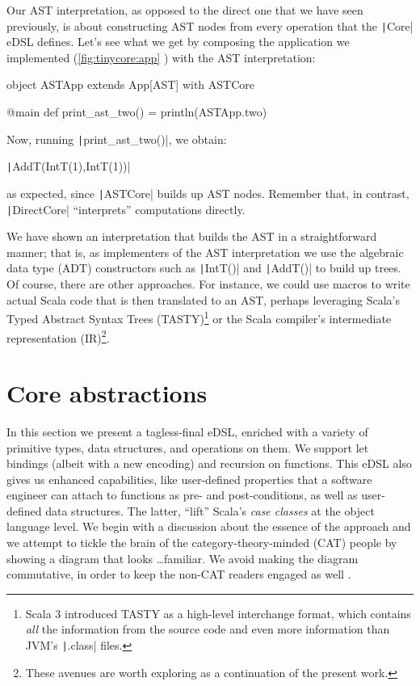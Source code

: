 \documentclass[11pt]{article}
\renewcommand{\vref}[1]{\autoref{#1} \vpageref{#1}}{}
\newcommand{\ScalaI}[1]{\texttt|#1|}
\newcommand{\TextI}[1]{\texttt|#1|}
\begin{document}
Our AST interpretation, as opposed to the direct one that we have seen previously, is about constructing AST nodes from every operation that the \ScalaI{Core} eDSL defines. Let's see what we get by composing the application we implemented (\vref{fig:tinycore:app}) with the AST interpretation:

\begin{ScalaBlockSimple}
object ASTApp extends App[AST] with ASTCore

@main def print_ast_two() = println(ASTApp.two)
\end{ScalaBlockSimple}

\noindent Now, running \ScalaI{print_ast_two()}, we obtain:

\par\ScalaI{AddT(IntT(1),IntT(1))}

\noindent as expected, since \ScalaI{ASTCore} builds up AST nodes. Remember that, in contrast, \ScalaI{DirectCore} ``interprets'' computations directly.

We have shown an interpretation that builds the AST in a straightforward manner; that is, as implementers of the AST interpretation we use the algebraic data type (ADT) constructors  such as \ScalaI{IntT()} and \ScalaI{AddT()} to build up trees. Of course, there are other approaches. For instance, we could use macros to write actual Scala code that is then translated to an AST, perhaps leveraging Scala's Typed Abstract Syntax Trees (TASTY)\footnote{Scala 3 introduced TASTY as a high-level interchange format, which contains \textit{all} the information from the source code and even more information than JVM's \TextI{.class} files.} or the Scala compiler's intermediate representation (IR)\footnote{These avenues are worth exploring as a continuation of the present work.}.


\section{Core abstractions}
\label{sec:core}
\begin{tcolorbox}
\faAngleDoubleRight{ } In this section we present a tagless-final eDSL, enriched with a variety of primitive types, data structures, and operations on them. We support let bindings (albeit with a new encoding) and recursion on functions. This eDSL also gives us enhanced capabilities, like user-defined properties that a software engineer can attach to functions as pre- and post-conditions, as well as user-defined data structures. The latter, ``lift'' Scala's \textit{case classes} at the object language level. We begin with a discussion about the essence of the approach and we attempt to tickle the brain of the category-theory-minded (CAT) people by showing%
{ } a diagram that looks \dots familiar. We avoid making the diagram commutative, in order to keep the non-CAT readers engaged as well%
.
\end{tcolorbox}
\end{document}
